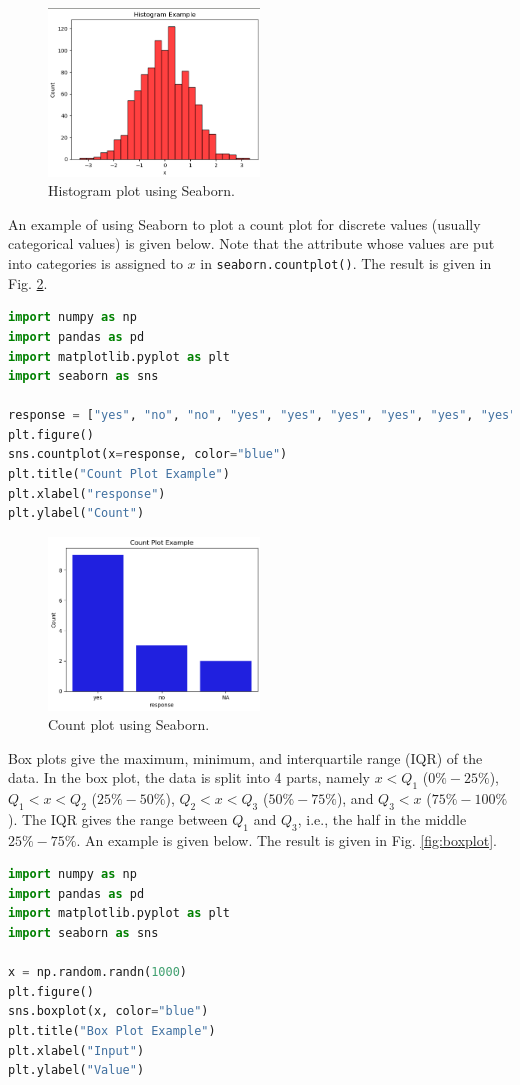 \begin{figure}[htbp]
	\centering
	\includegraphics[width=0.5\textwidth]{chapters/part-3/figures/normhistexp.png}
	\caption{Histogram plot using Seaborn.}
	\label{fig:normhistexp}
\end{figure}

An example of using Seaborn to plot a count plot for discrete values (usually categorical values) is given below. Note that the attribute whose values are put into categories is assigned to $x$ in \verb|seaborn.countplot()|. The result is given in Fig. \ref{fig:countplot}.
\begin{lstlisting}[language=Python]
import numpy as np
import pandas as pd
import matplotlib.pyplot as plt
import seaborn as sns

response = ["yes", "no", "no", "yes", "yes", "yes", "yes", "yes", "yes", "no", "yes", "yes", "NA", "NA"]
plt.figure()
sns.countplot(x=response, color="blue")
plt.title("Count Plot Example")
plt.xlabel("response")
plt.ylabel("Count")
\end{lstlisting}

\begin{figure}[htbp]
	\centering
	\includegraphics[width=0.5\textwidth]{chapters/part-3/figures/countplotexp.png}
	\caption{Count plot using Seaborn.}
	\label{fig:countplot}
\end{figure}

Box plots give the maximum, minimum, and interquartile range (IQR) of the data. In the box plot, the data is split into 4 parts, namely $x<Q_1$ ($0\%-25\%$), $Q_1<x<Q_2$ ($25\%-50\%$), $Q_2<x<Q_3$ ($50\%-75\%$), and $Q_3<x$ ($75\%-100\%$). The IQR gives the range between $Q_1$ and $Q_3$, i.e., the half in the middle $25\%-75\%$. An example is given below. The result is given in Fig. \ref{fig:boxplot}.
\begin{lstlisting}[language=Python]
import numpy as np
import pandas as pd
import matplotlib.pyplot as plt
import seaborn as sns

x = np.random.randn(1000)
plt.figure()
sns.boxplot(x, color="blue")
plt.title("Box Plot Example")
plt.xlabel("Input")
plt.ylabel("Value")
\end{lstlisting}

